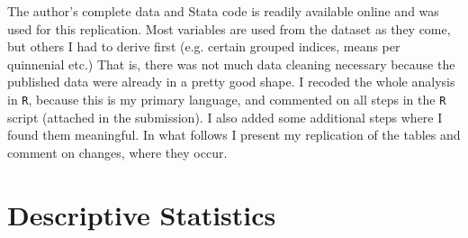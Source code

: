 \documentclass[a4paper]{article}\usepackage[]{graphicx}\usepackage[]{color}
\begin{document}
\hspace*{5mm} The author's complete data and Stata code is readily available online and was used for this replication. Most variables are used from the dataset as they come, but others I had to derive first (e.g. certain grouped indices, means per quinnenial etc.) That is, there was not much data cleaning necessary because the published data were already in a pretty good shape. I recoded the whole analysis in \texttt{R}, because this is my primary language, and commented on all steps in the \texttt{R} script (attached in the submission). I also added some additional steps where I found them meaningful. In what follows I present my replication of the tables and comment on changes, where they occur. 

\section{Descriptive Statistics}
\end{document}
